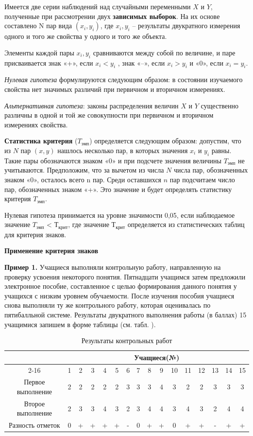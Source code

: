 \documentclass[12pt]{article}
\begin{document}
Имеется две серии наблюдений над случайными переменными $X$ и $Y$, полученные при рассмотрении двух \textbf{зависимых выборок}. На их основе составлено N пар вида $(x_i, y_i)$, где $x_i, y_i$ – результаты двукратного измерения одного и того же свойства у одного и того же объекта.

Элементы каждой пары $x_i, y_i$ сравниваются между собой по величине, и паре присваивается знак «+», если $x_i < y_i$ , знак «–», если $x_i > y_i$  и «0», если $x_i = y_i$.

\textit{Нулевая гипотеза} формулируются следующим образом: в состоянии изучаемого свойства нет значимых различий при первичном и вторичном измерениях.

\textit{Альтернативная гипотеза}: законы распределения величин $X$ и $Y$ существенно различны в одной и той же совокупности при первичном и вторичном измерениях свойства.

\bigskip
\textbf{Статистика критерия} ($T_{эмп}$) определяется следующим образом:
допустим, что из $N$ пар $(x, y)$ нашлось несколько пар, в которых значения $x_i$ и $y_i$ равны. Такие пары обозначаются знаком «0» и при подсчете значения величины $T_{эмп}$ не учитываются. Предположим, что за вычетом из числа $N$ числа пар, обозначенных знаком «0», осталось всего n пар. Среди оставшихся $n$ пар подсчитаем число пар, обозначенных знаком «+». Это значение и будет определять статистику критерия $T_{эмп}$.

Нулевая гипотеза принимается на уровне значимости 0,05, если наблюдаемое значение $T_{эмп}$ < $Т_{крит}$, где значение $Т_{крит}$ определяется из статистических таблиц для критерия знаков.

\medskip
\textbf{Применение критерия знаков}

\medskip
\textbf{Пример 1.} Учащиеся выполняли контрольную работу, направленную на проверку усвоения некоторого понятия. Пятнадцати учащимся затем предложили электронное пособие, составленное с целью формирования данного понятия у учащихся с низким уровнем обучаемости. После изучения пособия учащиеся снова выполняли ту же контрольного работу, которая оценивалась по пятибалльной системе.
Результаты двукратного выполнения работы (в баллах) 15 учащимися запишем в форме таблицы (см. табл. ).

\begin{table}[h]
    \centering
    \caption{Результаты контрольных работ}
    \bigskip
    \begin{tabular}{|c|c|c|c|c|c|c|c|c|c|c|c|c|c|c|c|} \hline
         \multirow{2}{*}{}&\multicolumn{15}{c|}{\textbf{Учащиеся(№)}} \\ \cline{2-16}
        &1&2&3&4&5&6&7&8&9&10&11&12&13&14&15 \\ \hline
        Первое выполнение&2&2&2&2&2&3&3&3&4&3&2&2&3&3&3 \\ \hline
        Второе выполнение&2&3&3&4&3&2&3&4&4&3&4&3&2&4&4 \\ \hline
        Разность отметок&0&+&+&+&+&-&0&+&+&0&+&+&-&+&+ \\ \hline
    \end{tabular}
\end{table}
\end{document}
